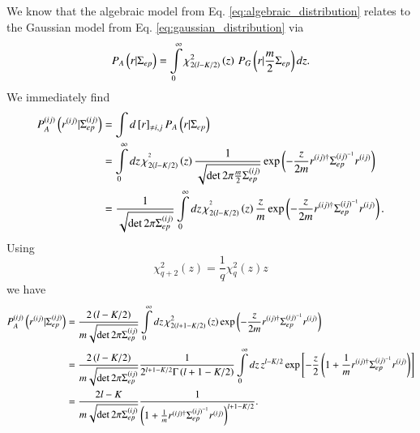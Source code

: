 We know that the algebraic model from Eq. \ref{eq:algebraic_distribution}
relates to the Gaussian model from Eq. \ref{eq:gaussian_distribution} via
\begin{equation}
    P_{A}\left(r|\Sigma_{ep}\right)
    =\intop_{0}^{\infty}\chi_{2\left(l-K/2\right)}^{2}\left(z\right)\,
    P_{G}\left(r|\frac{m}{2}\Sigma_{ep}\right)dz.
\end{equation}
We immediately find
\begin{align}
    P_{A}^{\left(ij\right)}\left(r^{\left(ij\right)}|
    \Sigma_{ep}^{\left(ij\right)}\right)
    & =\int d\left[r\right]_{\ne i,j}P_{A}\left(r|\Sigma_{ep}\right)\\
    & =\intop_{0}^{\infty}dz\,\chi_{2\left(l-K/2\right)}^{^{2}}\left(z\right)
    \frac{1}{\sqrt{\det2\pi\frac{m}{2}\Sigma_{ep}^{\left(ij\right)}}}
    \exp\left(-\frac{z}{2m}r^{\left(ij\right)\dagger}
    \Sigma_{ep}^{\left(ij\right)^{-1}}r^{\left(ij\right)}\right)\\
    & =\frac{1}{\sqrt{\det2\pi\Sigma_{ep}^{\left(ij\right)}}}
    \intop_{0}^{\infty}dz\,\chi_{2\left(l-K/2\right)}^{^{2}}\left(z\right)
    \frac{z}{m}\exp\left(-\frac{z}{2m}r^{\left(ij\right)\dagger}
    \Sigma_{ep}^{\left(ij\right)^{-1}}r^{\left(ij\right)}\right).
\end{align}
Using
\begin{equation}
    \chi_{q+2}^{2}\left(z\right)=\frac{1}{q}\chi_{q}^{2}\left(z\right)z
\end{equation}
we have
\begin{align}
    P_{A}^{\left(ij\right)}\left(r^{\left(ij\right)}|
    \Sigma_{ep}^{\left(ij\right)}\right)
    &=\frac{2\left(l-K/2\right)}{m\sqrt{\det2\pi\Sigma_{ep}^{\left(ij\right)}}}
    \intop_{0}^{\infty}dz\,\chi_{2\left(l+1-K/2\right)}^{2}\left(z\right)
    \exp\left(-\frac{z}{2m}r^{\left(ij\right)\dagger}
    \Sigma_{ep}^{\left(ij\right)^{-1}}r^{\left(ij\right)}\right)\\
    & =\frac{2\left(l-K/2\right)}{m\sqrt{\det2\pi\Sigma_{ep}
    ^{\left(ij\right)}}}\frac{1}{2^{l+1-K/2}\Gamma\left(l+1-K/2\right)}
    \intop_{0}^{\infty}dz\,z^{l-K/2}
    \exp\left[-\frac{z}{2}\left(1+\frac{1}{m}r^{\left(ij\right)\dagger}
    \Sigma_{ep}^{\left(ij\right)^{-1}}r^{\left(ij\right)}\right)\right]\\
    &=\frac{2l-K}{m\sqrt{\det2\pi\Sigma_{ep}^{\left(ij\right)}}}
    \frac{1}{\left(1+\frac{1}{m}r^{\left(ij\right)\dagger}
    \Sigma_{ep}^{\left(ij\right)^{-1}}r^{\left(ij\right)}\right)^{l+1-K/2}}
    \label{eq:using_chi}.
\end{align}
